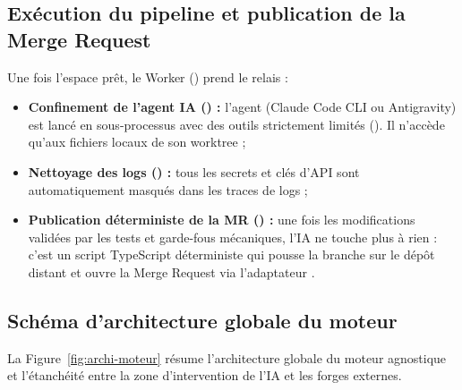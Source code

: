 \documentclass{tnreport}
\begin{document}
\subsection{Exécution du pipeline et publication de la Merge Request}
\label{subsec:execution_pipeline_mr}

Une fois l'espace prêt, le Worker () prend le relais :
\begin{itemize}
    \item \textbf{Confinement de l'agent IA () :}
    l'agent (Claude Code CLI ou Antigravity) est lancé en sous-processus avec des outils strictement limités (). Il n'accède qu'aux fichiers locaux de son worktree ;
    \item \textbf{Nettoyage des logs () :}
    tous les secrets et clés d'API sont automatiquement masqués dans les traces de logs ;
    \item \textbf{Publication déterministe de la MR () :}
    une fois les modifications validées par les tests et garde-fous mécaniques, l'IA ne touche plus à rien : c'est un script TypeScript déterministe qui pousse la branche sur le dépôt distant et ouvre la Merge Request via l'adaptateur .
\end{itemize}

\subsection{Schéma d'architecture globale du moteur}
\label{subsec:schema_architecture_moteur}

La Figure~\ref{fig:archi-moteur} résume l'architecture globale du moteur agnostique et l'étanchéité entre la zone d'intervention de l'IA et les forges externes.
\end{document}
